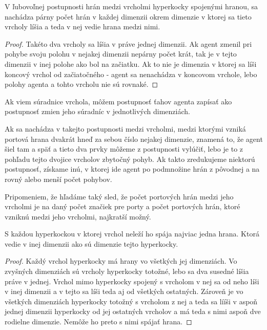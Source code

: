 \begin{lem}
V ľubovoľnej postupnosti hrán medzi vrcholmi hyperkocky spojenými hranou, sa
nachádza párny počet hrán v každej dimenzii okrem dimenzie v ktorej sa tieto
vrcholy líšia a teda v nej vedie hrana medzi nimi.
\end{lem}
\begin{proof}
Takéto dva vrcholy sa líšia v práve jednej dimenzii. Ak agent zmenil pri 
pohybe svoju polohu v nejakej dimenzii nepárny počet 
krát, tak je v tejto dimenzii v inej polohe ako bol na začiatku. Ak to nie je 
dimenzia v ktorej sa líši koncový vrchol od začiatočného - agent sa
nenachádza v koncovom vrchole, lebo polohy agenta a tohto vrcholu nie sú
rovnaké.
\end{proof}

\begin{ozn}
Ak viem súradnice vrchola, môžem postupnosť ťahov agenta zapísať ako postupnosť 
zmien jeho súradníc v jednotlivých dimenziách. 
\end{ozn}
Ak sa nachádza v takejto postupnosti medzi
vrcholmi, medzi ktorými vzniká portová hrana dvakrát hneď za sebou číslo
nejakej dimenzie, znamená to, že agent šiel tam a späť a tieto dva prvky
môžeme z postupnosti vylúčiť, lebo je to z pohľadu tejto dvojice vrcholov
zbytočný pohyb. Ak takto zredukujeme niektorú postupnosť, získame inú, v
ktorej ide agent po podmnožine hrán z pôvodnej a na rovný alebo menší počet
pohybov.
\begin{pozn}
Pripomeniem, že hľadáme taký sled, že počet portových hrán medzi jeho
vrcholmi je na daný počet značiek pre porty a počet portových hrán, ktoré
vzniknú medzi jeho vrcholmi, najkratší možný.
\end{pozn}



\begin{lem}
S každou hyperkockou v ktorej vrchol neleží ho spája najviac jedna hrana.
Ktorá vedie v inej dimenzii ako sú dimenzie tejto hyperkocky.
\end{lem}
\begin{proof}
Každý vrchol hyperkocky má hrany vo všetkých jej dimenziách. Vo zvyšných
dimenziách sú vrcholy hyperkocky totožné, lebo sa dva susedné líšia práve v
jednej. Vrchol mimo hyperkocky spojený s vrcholom v nej sa od neho líši v
inej dimenzii a v tejto sa líši teda aj od všetkých ostatných. Zároveň je vo
všetkých dimenziách hyperkocky totožný s vrcholom z nej a teda sa lííši v
aspoň jednej dimenzii hyperkocky od jej ostatných vrcholov a má teda s nimi
aspoň dve rodielne dimenzie. Nemôže ho preto s nimi spájať hrana.
\end{proof}

